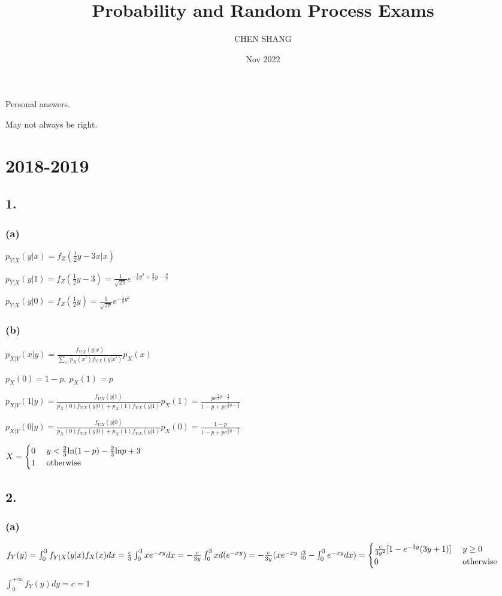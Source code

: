\documentclass{article}
\title{Probability and Random Process Exams}
\author{CHEN SHANG }
\date{Nov 2022}
\begin{document}
\maketitle
{\Huge
Personal answers.\par
May not always be right.\par}
\section*{2018-2019}
\subsection*{1.}
\subsubsection*{(a)}
$p_{Y|X}(y|x)=f_{Z}(\frac{1}{2}y-3x|x)$\par
$p_{Y|X}(y|1)=f_{Z}(\frac{1}{2}y-3)=\frac{1}{\sqrt{2\pi}}e^{-\frac{1}{8}y^{2}+\frac{3}{2}y-\frac{9}{2}}$\par
$p_{Y|X}(y|0)=f_{Z}(\frac{1}{2}y)=\frac{1}{\sqrt{2\pi}}e^{-\frac{1}{8}y^{2}}$\par
\subsubsection*{(b)}
$p_{X|Y}(x|y)=\frac{f_{Y|X}(y|x)}{\sum_{x'}p_{X}(x')f_{Y|X}(y|x')}p_{X}(x)$\par
$p_{X}(0)=1-p, \ p_{X}(1)=p$\par
$p_{X|Y}(1|y)=\frac{f_{Y|X}(y|1)}{p_{X}(0)f_{Y|X}(y|0)+p_{X}(1)f_{Y|X}(y|1)}p_{X}(1)=\frac{pe^{\frac{3}{2}y-\frac{9}{2}}}{1-p+pe^{\frac{3}{2}y-\frac{9}{2}}}$\par
$p_{X|Y}(0|y)=\frac{f_{Y|X}(y|0)}{p_{X}(0)f_{Y|X}(y|0)+p_{X}(1)f_{Y|X}(y|1)}p_{X}(0)=\frac{1-p}{1-p+pe^{\frac{3}{2}y-\frac{9}{2}}}$\par
$X=\begin{cases}
0 \ &y<\frac{2}{3}{\rm ln}(1-p)-\frac{2}{3}{\rm ln}p+3\\
1 \ &{\rm otherwise}
\end{cases}$

\subsection*{2.}
\subsubsection*{(a)}
$f_{Y}(y)=\int_{0}^{3}f_{Y|X}(y|x)f_{X}(x)dx\\
=\frac{c}{3}\int_{0}^{3}xe^{-xy}dx\\
=-\frac{c}{3y}\int_{0}^{3}xd(e^{-xy})\\
=-\frac{c}{3y}(xe^{-xy}\mid_{0}^{3}-\int_{0}^{3}e^{-xy}dx)\\
=\begin{cases}
\frac{c}{3y^{2}}[1-e^{-3y}(3y + 1)] \ &y \geq 0\\
0 \ &{\rm otherwise}
\end{cases}$\par
$\int_{0}^{+\infty}f_{Y}(y)dy=c=1$
\end{document}
